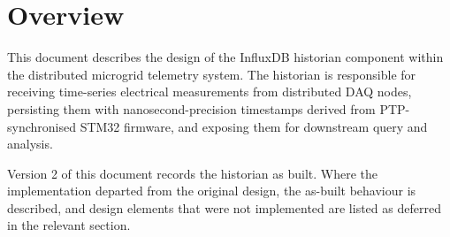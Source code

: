 \section{Overview}
This document describes the design of the InfluxDB historian component within the distributed microgrid telemetry system. The historian is responsible for receiving time-series electrical measurements from distributed DAQ nodes, persisting them with nanosecond-precision timestamps derived from PTP-synchronised STM32 firmware, and exposing them for downstream query and analysis.

Version 2 of this document records the historian as built. Where the implementation departed from the original design, the as-built behaviour is described, and design elements that were not implemented are listed as deferred in the relevant section.
